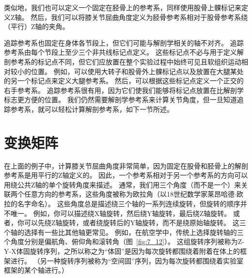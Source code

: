 类似地，我们也可以定义一个固定在胫骨上的参考系，同样使用股骨上髁标记来定义Z轴。
然后，我们可以将膝关节屈曲角度定义为胫骨参考系相对于股骨参考系绕（平行）Z轴的夹角。


追踪参考系也固定在身体各节段上，但它们可能与解剖学相关的轴不对齐。
追踪参考系由每个节段上至少三个非共线标记点定义。
这些标记点不必与用于定义解剖参考系的标记点不同，但它们应放置在整个实验过程中始终可见且软组织运动相对较小的位置。
例如，可以使用大转子和股骨外上髁标记点以及放置在大腿某处的另一个标记点​​来定义大腿参考系。
然后，可以根据这些标记点定义一个正交的右手参考系。
追踪参考系很有用，因为它们使我们能够将标记点放置在比解剖学标志更方便的位置。
我们仍然需要解剖学参考系来计算关节角度，但一旦知道追踪参考系，就可以轻松计算解剖参考系，如下一节所述。



\section{变换矩阵}

在上面的例子中，计算膝关节屈曲角度非常简单，因为固定在股骨和胫骨上的解剖参考系是用平行的Z轴定义的。
因此，一个参考系相对于另一个参考系的方向可以用绕公共Z轴的单个旋转角度来描述。
通常，我们用三个角度（而不是一个）来关联两个任意方向的参考系，这些角度被称为欧拉角（以18世纪数学家莱昂哈德$\cdot$欧拉的名字命名）。
这些角度总是描述绕三个轴的一系列连续旋转，但旋转的顺序并不唯一。
例如，你可以描述绕X轴旋转，然后绕Y轴旋转，最后绕Z轴旋转。
或者，你可以先绕Z轴旋转，或者绕旋转后的Y轴旋转，而不是绕原始轴旋转。
这三个轴的选择有一些比其他轴更常见。
例如，在航空学中，传统上选择旋转轴的三个角度分别是偏航角、俯仰角和滚转角（图~\ref{fig:7_12}）。
这组旋转序列被称为Z-Y-X体固旋转序列，之所以称之为“体固”是因为每次旋转都围绕着附着在体上的框架进行。
（另一种旋转序列被称为“空间固”序列，因为每次旋转都围绕着实验室框架的某个轴进行。）


